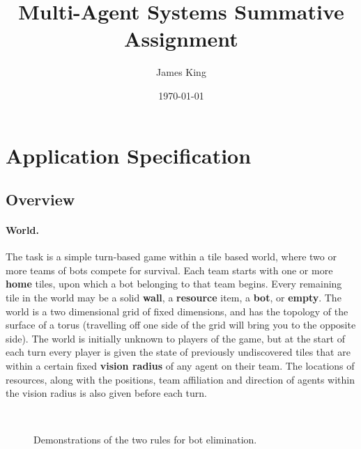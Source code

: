 \documentclass[a4paper,10pt]{article}
\title{Multi-Agent Systems Summative Assignment}
\date{\today}
\author{James King}
\begin{document}
\maketitle

\section{Application Specification}
\subsection{Overview}
\paragraph{World.}
The task is a simple turn-based game within a tile based world, where two or more teams of bots compete for survival. Each team starts with one or more \textbf{home} tiles, upon which a bot belonging to that team begins. Every remaining tile in the world may be a solid \textbf{wall}, a \textbf{resource} item, a \textbf{bot}, or \textbf{empty}. The world is a two dimensional grid of fixed dimensions, and has the topology of the surface of a torus (travelling off one side of the grid will bring you to the opposite side). The world is initially unknown to players of the game, but at the start of each turn every player is given the state of previously undiscovered tiles that are within a certain fixed \textbf{vision radius} of any agent on their team. The locations of resources, along with the positions, team affiliation and direction of agents within the vision radius is also given before each turn.

\begin{figure}[ht]
  \centering
  \mbox{
    \quad
  }
  \caption{Demonstrations of the two rules for bot elimination.}
  \vspace{-5mm}
\end{figure}
\end{document}
